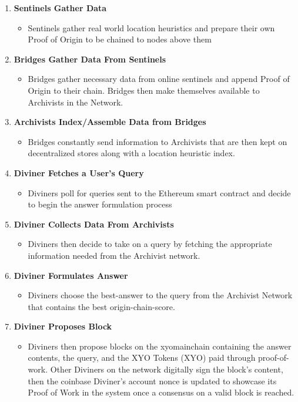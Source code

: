 \documentclass{article}
\begin{document}
\begin{enumerate}
  \item \textbf{Sentinels Gather Data}
  \begin{itemize}
    \item Sentinels gather real world location heuristics and prepare their own Proof of Origin to be chained to nodes above them
  \end{itemize}
  \item \textbf{Bridges Gather Data From Sentinels}
  \begin{itemize}
    \item Bridges gather necessary data from online sentinels and append Proof of Origin to their chain. Bridges then make themselves available to Archivists in the Network.
  \end{itemize}
  \item \textbf{Archivists Index/Assemble Data from Bridges}
  \begin{itemize}
    \item Bridges constantly send information to Archivists that are then kept on decentralized stores along with a location heuristic index.
  \end{itemize}
  \item \textbf{Diviner Fetches a User's Query}
  \begin{itemize}
    \item Diviners poll for queries sent to the Ethereum smart contract and decide to begin the answer formulation process
  \end{itemize}
  \item \textbf{Diviner Collects Data From Archivists}
  \begin{itemize}
    \item  Diviners then decide to take on a query by fetching the appropriate information needed from the Archivist network.
  \end{itemize}
  \item \textbf{Diviner Formulates Answer}
  \begin{itemize}
    \item Diviners choose the \Gls{best-answer} to the query from the Archivist Network that contains the best \Gls{origin-chain-score}.
  \end{itemize}
  \item \textbf{Diviner Proposes Block}
  \begin{itemize}
    \item Diviners then propose blocks on the \Gls{xyomainchain} containing the answer contents, the query, and the XYO Tokens (XYO) paid through \Gls{proof-of-work}. Other Diviners on the network digitally sign the block's content, then the coinbase Diviner's account nonce is updated to showcase its Proof of Work in the system once a consensus on a valid block is reached.

\end{itemize}
\end{enumerate}
\end{document}
